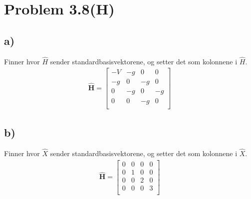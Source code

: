 \documentclass[norsk,a4paper,12pt]{article}
\begin{document}
\section*{Problem 3.8(H)}

	\subsection*{a)}
		Finner hvor $\hat{H}$ sender standardbasisvektorene, og setter det som kolonnene i $\hat{H}$.
		\begin{equation*}
		\begin{aligned}
		\mathbf{\hat{H}} = \begin{bmatrix}
		-V & -g & 0 & 0 \\
		-g & 0 & -g & 0 \\
		0 & -g & 0 & -g \\
		0 & 0 & -g & 0 \\
		\end{bmatrix}
		\end{aligned}
		\end{equation*}
		
	\subsection*{b)}
		Finner hvor $\hat{X}$ sender standardbasisvektorene, og setter det som kolonnene i $\hat{X}$.
		\begin{equation*}
		\begin{aligned}
		\mathbf{\hat{H}} = \begin{bmatrix}
		0 & 0 & 0 & 0 \\
		0 & 1 & 0 & 0 \\
		0 & 0 & 2 & 0 \\
		0 & 0 & 0 & 3 \\
		\end{bmatrix}
		\end{aligned}
		\end{equation*}
		
\end{document}
